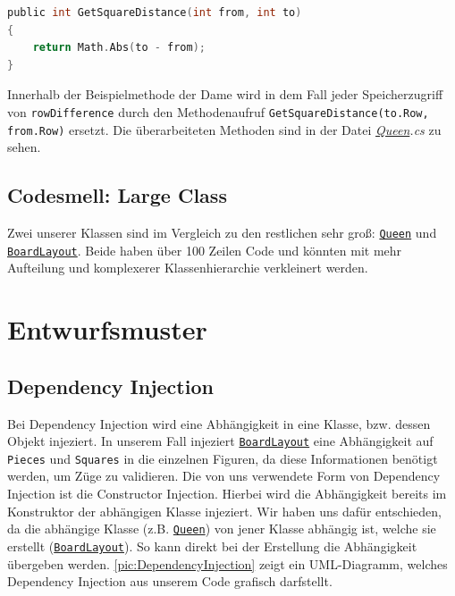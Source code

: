 \documentclass[
10pt, %
a4paper, %
oneside, %
headinclude,footinclude, %
BCOR5mm, %
]{scrartcl}
\begin{document}
\begin{onehalfspace}
\begin{lstlisting}[language=c, style=mStyle]
public int GetSquareDistance(int from, int to)
{
	return Math.Abs(to - from);
}
\end{lstlisting}

Innerhalb der Beispielmethode der Dame wird in dem Fall jeder Speicherzugriff von \texttt{rowDifference} durch den Methodenaufruf \texttt{GetSquareDistance(to.Row, from.Row)} ersetzt. Die überarbeiteten Methoden sind in der Datei \textit{\href{https://github.com/schmida736/Chess-AdvancedSE/blob/main/Chess-AdvancedSE/Game\%20Elements/Pieces/Queen.cs}{Queen}.cs} zu sehen. 

\subsection{Codesmell: Large Class}
Zwei unserer Klassen sind im Vergleich zu den restlichen sehr groß: \texttt{\href{https://github.com/schmida736/Chess-AdvancedSE/blob/main/Chess-AdvancedSE/Game\%20Elements/Pieces/Queen.cs}{Queen}} und \texttt{\href{https://github.com/schmida736/Chess-AdvancedSE/blob/main/Chess-AdvancedSE/Game\%20Elements/BoardLayout.cs}{BoardLayout}}. Beide haben über 100 Zeilen Code und könnten mit mehr Aufteilung und komplexerer Klassenhierarchie verkleinert werden.

\newpage
\section{Entwurfsmuster}

\subsection{Dependency Injection}
\label{sec:depInjec}
Bei Dependency Injection wird eine Abhängigkeit in eine Klasse, bzw. dessen Objekt injeziert. In unserem Fall injeziert \texttt{\href{https://github.com/schmida736/Chess-AdvancedSE/blob/main/Chess-AdvancedSE/Game\%20Elements/BoardLayout.cs}{BoardLayout}} eine Abhängigkeit auf \texttt{Pieces} und \texttt{Squares} in die einzelnen Figuren, da diese Informationen benötigt werden, um Züge zu validieren. Die von uns verwendete Form von Dependency Injection ist die Constructor Injection. Hierbei wird die Abhängigkeit bereits im Konstruktor der abhängigen Klasse injeziert. Wir haben uns dafür entschieden, da die abhängige Klasse (z.B. \texttt{\href{https://github.com/schmida736/Chess-AdvancedSE/blob/main/Chess-AdvancedSE/Game\%20Elements/Pieces/Queen.cs}{Queen}}) von jener Klasse abhängig ist, welche sie erstellt (\texttt{\href{https://github.com/schmida736/Chess-AdvancedSE/blob/main/Chess-AdvancedSE/Game\%20Elements/BoardLayout.cs}{BoardLayout}}). So kann direkt bei der Erstellung die Abhängigkeit übergeben werden. \autoref{pic:DependencyInjection} zeigt ein UML-Diagramm, welches Dependency Injection aus unserem Code grafisch darfstellt.


\end{onehalfspace}
\end{document}

